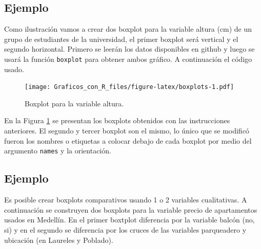 \documentclass[10pt,]{krantz}
\makeatletter
\newenvironment{Shaded}{\begin{snugshade}}{\end{snugshade}}
\newcommand{\KeywordTok}[1]{\textcolor[rgb]{0.13,0.29,0.53}{\textbf{#1}}}
\newcommand{\DataTypeTok}[1]{\textcolor[rgb]{0.13,0.29,0.53}{#1}}
\newcommand{\DecValTok}[1]{\textcolor[rgb]{0.00,0.00,0.81}{#1}}
\newcommand{\StringTok}[1]{\textcolor[rgb]{0.31,0.60,0.02}{#1}}
\newcommand{\OtherTok}[1]{\textcolor[rgb]{0.56,0.35,0.01}{#1}}
\newcommand{\OperatorTok}[1]{\textcolor[rgb]{0.81,0.36,0.00}{\textbf{#1}}}
\newcommand{\NormalTok}[1]{#1}
\newenvironment{kframe}{%
\medskip{}
\setlength{\fboxsep}{.8em}
 \def\at@end@of@kframe{}%
 \ifinner\ifhmode%
  \def\at@end@of@kframe{\end{minipage}}%
  \begin{minipage}{\columnwidth}%
 \fi\fi%
 \def\FrameCommand##1{\hskip\@totalleftmargin \hskip-\fboxsep
 \colorbox{shadecolor}{##1}\hskip-\fboxsep
     \hskip-\linewidth \hskip-\@totalleftmargin \hskip\columnwidth}%
 \MakeFramed {\advance\hsize-\width
   \@totalleftmargin\z@ \linewidth\hsize
   \@setminipage}}%
 {\par\unskip\endMakeFramed%
 \at@end@of@kframe}
\renewenvironment{Shaded}{\begin{kframe}}{\end{kframe}}
\makeatother
\begin{document}
\subsection*{Ejemplo}\label{ejemplo-1}


Como ilustración vamos a crear dos boxplot para la variable altura (cm)
de un grupo de estudiantes de la universidad, el primer boxplot será
vertical y el segundo horizontal. Primero se leerán los datos
disponibles en github y luego se usará la función \texttt{boxplot} para
obtener ambos gráfico. A continuación el código usado.

\begin{Shaded}
\end{Shaded}

\begin{figure}
\centering
\texttt{[image: Graficos\_con\_R\_files/figure-latex/boxplots-1.pdf]}
\caption{\label{fig:boxplots}Boxplot para la variable altura.}
\end{figure}

En la Figura \ref{fig:boxplots} se presentan los boxplots obtenidos con
las instrucciones anteriores. El segundo y tercer boxplot son el mismo,
lo único que se modificó fueron los nombres o etiquetas a colocar debajo
de cada boxplot por medio del argumento \texttt{names} y la orientación.

\subsection*{Ejemplo}\label{ejemplo-2}


 Es posible crear boxplots comparativos
usando 1 o 2 variables cualitativas. A continuación se construyen dos
boxplots para la variable precio de apartamentos usados en Medellín. En
el primer boxtplot diferencia por la variable balcón (no, si) y en el
segundo se diferencia por los cruces de las variables parqueadero y
ubicación (en Laureles y Poblado).
\end{document}
